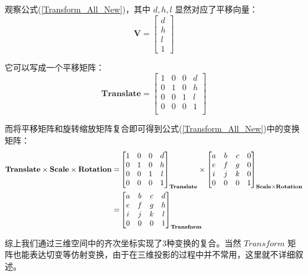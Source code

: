 \documentclass[12pt,oneside,a4paper]{ctexart}
\begin{document}
观察公式(\ref{Transform_All_New})，其中 $d, h, l$ 显然对应了平移向量：
\begin{equation*}
	\mathbf{V}=
	\begin{bmatrix}
		d \\
		h \\
		l \\
		1
	\end{bmatrix}
\end{equation*}

它可以写成一个平移矩阵：
\begin{equation}
	\mathbf{Translate}=
	\begin{bmatrix}
		1 & 0 & 0 & d \\
		0 & 1 & 0 & h \\
		0 & 0 & 1 & l \\
		0 & 0 & 0 & 1 \\
	\end{bmatrix}
	\label{Translate_Matrix}
\end{equation}

而将平移矩阵和旋转缩放矩阵复合即可得到公式(\ref{Transform_All_New})中的变换矩阵：
\begin{align}
	\mathbf{Translate}\times \mathbf{Scale}\times \mathbf{Rotation}= &
	\begin{bmatrix}
		1 & 0 & 0 & d \\
		0 & 1 & 0 & h \\
		0 & 0 & 1 & l \\
		0 & 0 & 0 & 1 \\
	\end{bmatrix}_{\mathbf{Translate}}
	\times
	\begin{bmatrix}
		a & b & c & 0 \\
		e & f & g & 0 \\
		i & j & k & 0 \\
		0 & 0 & 0 & 1
	\end{bmatrix}_{\mathbf{Scale}\times \mathbf{Rotation}}         \notag                                       \\
	=                                                                & \begin{bmatrix}
		a & b & c & d \\
		e & f & g & h \\
		i & j & k & l \\
		0 & 0 & 0 & 1
	\end{bmatrix}_{\mathbf{Transform}}\notag
\end{align}

综上我们通过三维空间中的齐次坐标实现了3种变换的复合。当然 $Transform$ 矩阵也能表达切变等仿射变换，由于在三维投影的过程中并不常用，这里就不详细叙述。
\end{document}
